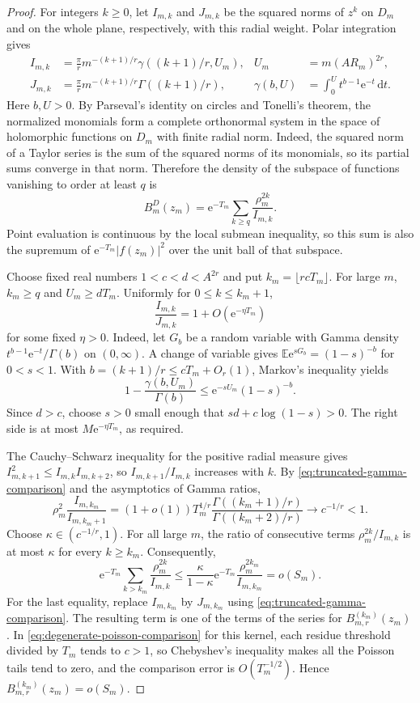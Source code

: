 \begin{proof}
For integers $k\geq0$, let $I_{m,k}$ and $J_{m,k}$ be the squared norms of $z^k$ on $D_m$ and on the whole plane, respectively, with this radial weight. Polar integration gives
\[
 \begin{aligned}
 I_{m,k}&=\frac\pi r m^{-(k+1)/r}\gamma((k+1)/r,U_m),
 &U_m&=m(A R_m)^{2r},\\
 J_{m,k}&=\frac\pi r m^{-(k+1)/r}\Gamma((k+1)/r),
 &\gamma(b,U)&=\int_0^U t^{b-1}\mathrm{e}^{-t}\,\mathrm{d}t.
 \end{aligned}
\]
Here $b,U>0$. By Parseval's identity on circles and Tonelli's theorem, the normalized monomials form a complete orthonormal system in the space of holomorphic functions on $D_m$ with finite radial norm. Indeed, the squared norm of a Taylor series is the sum of the squared norms of its monomials, so its partial sums converge in that norm. Therefore the density of the subspace of functions vanishing to order at least $q$ is
\[
 B_m^{D}(z_m)=\mathrm{e}^{-T_m}\sum_{k\geq q}\frac{\rho_m^{2k}}{I_{m,k}}.
\]
Point evaluation is continuous by the local submean inequality, so this sum is also the supremum of $\mathrm{e}^{-T_m}|f(z_m)|^2$ over the unit ball of that subspace.

Choose fixed real numbers $1<c<d<A^{2r}$ and put $k_m=\lfloor rcT_m\rfloor$. For large $m$, $k_m\geq q$ and $U_m\geq dT_m$. Uniformly for $0\leq k\leq k_m+1$,
\begin{equation}\label{eq:truncated-gamma-comparison}
 \frac{I_{m,k}}{J_{m,k}}=1+O(\mathrm{e}^{-\eta T_m})
\end{equation}
for some fixed $\eta>0$. Indeed, let $G_b$ be a random variable with Gamma density $t^{b-1}\mathrm{e}^{-t}/\Gamma(b)$ on $(0,\infty)$. A change of variable gives $\mathbb E\mathrm{e}^{sG_b}=(1-s)^{-b}$ for $0<s<1$. With $b=(k+1)/r\leq cT_m+O_r(1)$, Markov's inequality yields
\[
 1-\frac{\gamma(b,U_m)}{\Gamma(b)}
 \leq\mathrm{e}^{-sU_m}(1-s)^{-b}.
\]
Since $d>c$, choose $s>0$ small enough that $sd+c\log(1-s)>0$. The right side is at most $M\mathrm{e}^{-\eta T_m}$, as required.

The Cauchy--Schwarz inequality for the positive radial measure gives
$I_{m,k+1}^2\leq I_{m,k}I_{m,k+2}$, so $I_{m,k+1}/I_{m,k}$ increases with $k$. By \eqref{eq:truncated-gamma-comparison} and the asymptotics of Gamma ratios,
\[
 \rho_m^2\frac{I_{m,k_m}}{I_{m,k_m+1}}
 =(1+o(1))T_m^{1/r}
   \frac{\Gamma((k_m+1)/r)}{\Gamma((k_m+2)/r)}
 \longrightarrow c^{-1/r}<1.
\]
Choose $\kappa\in(c^{-1/r},1)$. For all large $m$, the ratio of consecutive terms $\rho_m^{2k}/I_{m,k}$ is at most $\kappa$ for every $k\geq k_m$. Consequently,
\[
 \mathrm{e}^{-T_m}\sum_{k>k_m}\frac{\rho_m^{2k}}{I_{m,k}}
 \leq\frac{\kappa}{1-\kappa}
          \mathrm{e}^{-T_m}\frac{\rho_m^{2k_m}}{I_{m,k_m}}
 =o(S_m).
\]
For the last equality, replace $I_{m,k_m}$ by $J_{m,k_m}$ using \eqref{eq:truncated-gamma-comparison}. The resulting term is one of the terms of the series for $B_{m,r}^{(k_m)}(z_m)$. In \eqref{eq:degenerate-poisson-comparison} for this kernel, each residue threshold divided by $T_m$ tends to $c>1$, so Chebyshev's inequality makes all the Poisson tails tend to zero, and the comparison error is $O(T_m^{-1/2})$. Hence $B_{m,r}^{(k_m)}(z_m)=o(S_m)$.


\end{proof}
